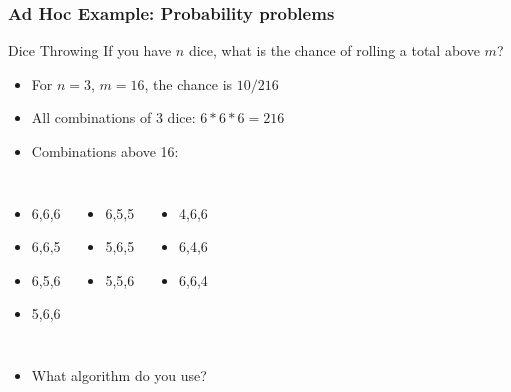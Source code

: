 \documentclass{beamer}
\begin{document}
\begin{frame}
  \frametitle{Ad Hoc Example: Probability problems}

  {\smaller
    \begin{block}{Dice Throwing}
      If you have $n$ dice, what is the chance of rolling a total above $m$?
    \end{block}

    \begin{itemize}
    \item {} For $n=3$, $m=16$, the chance is $10/216$

      \bigskip

    \item All combinations of 3 dice: $6*6*6 = 216$
    \item Combinations above 16:
    \end{itemize}

    \begin{columns}[T]
      \begin{itemize}
      \item 6,6,6
      \item 6,6,5
      \item 6,5,6
      \item 5,6,6
      \end{itemize}
      \begin{itemize}
      \item 6,5,5
      \item 5,6,5
      \item 5,5,6
      \end{itemize}
      \begin{itemize}
      \item 4,6,6
      \item 6,4,6
      \item 6,6,4
      \end{itemize}
    \end{columns}

    \medskip

    \begin{itemize}
    \item What algorithm do you use?
    \end{itemize}
  }
\end{frame}
\end{document}
